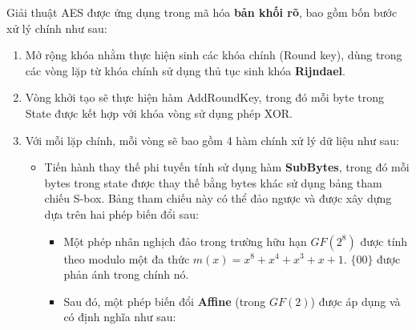 Giải thuật AES được ứng dụng trong mã hóa \textbf{bản khối rõ}, bao gồm bốn bước xử lý chính như sau:

\begin{enumerate}[label= \textbf{Bước \arabic*:}]
	\item Mở rộng khóa nhằm thực hiện sinh các khóa chính (Round key), dùng trong các vòng lặp từ khóa chính sử dụng thủ tục sinh khóa \textbf{Rijndael}.
	\item Vòng khởi tạo sẽ thực hiện hàm AddRoundKey, trong đó mỗi byte trong State được kết hợp với khóa vòng sử dụng phép XOR.
	\item Với mỗi lặp chính, mỗi vòng sẽ bao gồm 4 hàm chính xử lý dữ liệu như sau:
	\begin{itemize}
		\item Tiến hành thay thế phi tuyến tính sử dụng hàm \textbf{SubBytes}, trong đó mỗi bytes trong state được thay thế bằng bytes khác sử dụng bảng tham chiếu S-box. Bảng tham chiếu này có thể đảo ngược và được xây dựng dựa trên hai phép biến đổi sau:
		\begin{itemize}
			\item Một phép nhân nghịch đảo trong trường hữu hạn $GF(2^8)$ được tính theo modulo một đa thức $m(x) = x^8 + x^4 + x^3 + x + 1$. $\{00\}$ được phản ánh trong chính nó.
			\item Sau đó, một phép biến đổi \textbf{Affine} (trong $GF(2)$) được áp dụng và có định nghĩa như sau:
			

\end{itemize}
\end{itemize}
\end{enumerate}
